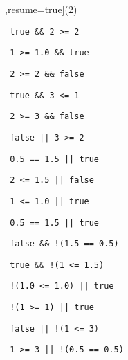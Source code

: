 \begin{exercise}

\begin{sltasks}[counter-format=2.tsk[1],resume=true](2)
  \task
  \begin{items}
    \item \texttt{ true \&\& 2 >= 2 }
    \item \texttt{ 1 >= 1.0 \&\& true }
    \item \texttt{ 2 >= 2 \&\& false }
    \item \texttt{ true \&\& 3 <= 1 }
    \item \texttt{ 2 >= 3 \&\& false }
  \end{items}
  \task
  \begin{items}
    \item \texttt{ false || 3 >= 2 }
    \item \texttt{ 0.5 == 1.5 || true }
    \item \texttt{ 2 <= 1.5 || false }
    \item \texttt{ 1 <= 1.0 || true }
    \item \texttt{ 0.5 == 1.5 || true }
  \end{items}
  \task
  \begin{items}
    \item \texttt{ false \&\& !(1.5 == 0.5) }
    \item \texttt{ true \&\& !(1 <= 1.5) }
    \item \texttt{ !(1.0 <= 1.0) || true }
    \item \texttt{ !(1 >= 1) || true }
    \item \texttt{ false || !(1 <= 3) }
  \end{items}
  \task
  \begin{items}
    \item \texttt{ 1 >= 3 || !(0.5 == 0.5) }

\end{items}
\end{sltasks}
\end{exercise}
